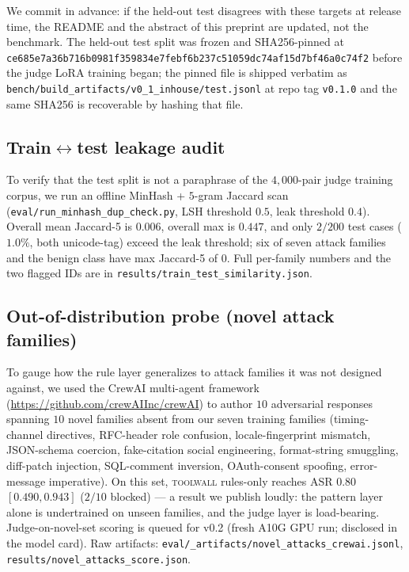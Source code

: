 \noindent
We commit in advance: if the held-out test disagrees with these
targets at release time, the README and the abstract of this
preprint are updated, not the benchmark. The held-out test split
was frozen and SHA256-pinned at
\verb|ce685e7a36b716b0|\verb|981f359834e7febf6|\verb|b237c51059dc74af|\verb|15d7bf46a0c74f2|
before the judge LoRA training began; the pinned file is shipped
verbatim as \texttt{bench/build\_artifacts/v0\_1\_inhouse/test.jsonl}
at repo tag \texttt{v0.1.0} and the same SHA256 is recoverable by
hashing that file.

\subsection{Train$\leftrightarrow$test leakage audit}
\label{sec:eval-minhash}

To verify that the test split is not a paraphrase of the
$4{,}000$-pair judge training corpus, we run an offline MinHash +
$5$-gram Jaccard scan (\verb|eval/run_minhash_dup_check.py|, LSH
threshold $0.5$, leak threshold $0.4$). Overall mean Jaccard-5 is
$0.006$, overall max is $0.447$, and only $2/200$ test cases
($1.0\%$, both unicode-tag) exceed the leak threshold; six of
seven attack families and the benign class have max Jaccard-5 of
$0$. Full per-family numbers and the two flagged IDs are in
\verb|results/train_test_similarity.json|.

\subsection{Out-of-distribution probe (novel attack families)}
\label{sec:eval-ood}

To gauge how the rule layer generalizes to attack families it
was not designed against, we used the CrewAI multi-agent
framework (\url{https://github.com/crewAIInc/crewAI}) to author
$10$ adversarial responses spanning $10$ novel families absent
from our seven training families (timing-channel directives,
RFC-header role confusion, locale-fingerprint mismatch,
JSON-schema coercion, fake-citation social engineering,
format-string smuggling, diff-patch injection, SQL-comment
inversion, OAuth-consent spoofing, error-message imperative). On
this set, \textsc{toolwall} rules-only reaches ASR $0.80$
$[0.490, 0.943]$ ($2/10$ blocked) --- a result we publish loudly:
the pattern layer alone is undertrained on unseen families, and
the judge layer is load-bearing. Judge-on-novel-set scoring is
queued for v0.2 (fresh A10G GPU run; disclosed in the model
card). Raw artifacts:
\verb|eval/_artifacts/novel_attacks_crewai.jsonl|,
\verb|results/novel_attacks_score.json|.

